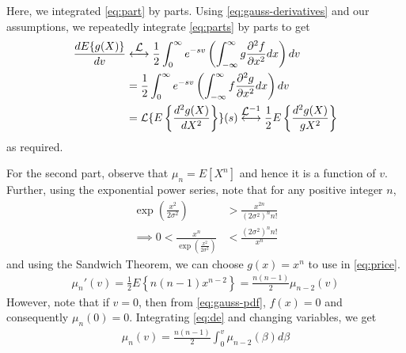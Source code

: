 \documentclass{beamer}
\newcommand\laplace{\ensuremath{\stackrel{\mathclap{\mbox{$\mathcal{L}$}}}{\longleftrightarrow}}}
\newcommand\laplaceinv{\ensuremath{\stackrel{\mathclap{\mbox{$\mathcal{L}^{-1}$}}}{\longleftrightarrow}}}
\begin{document}
\begin{frame}
	Here, we integrated \eqref{eq:part} by parts. Using \eqref{eq:gauss-derivatives} and our assumptions, we repeatedly integrate \eqref{eq:parts} by parts to get
	\begin{align}
		\frac{dE\{g(X)\}}{dv} &\laplace \frac{1}{2}\int_{0}^{\infty}e^{-sv}\left(\int_{-\infty}^{\infty}g\frac{\partial^2 f}{\partial x^2}dx\right)dv \label{eq:parts} \\
		&= \frac{1}{2}\int_{0}^{\infty}e^{-sv}\left(\int_{-\infty}^{\infty}f\frac{\partial^2 g}{\partial x^2}dx\right)dv \\
		&= \mathcal{L}\{E\left\{\frac{d^2g(X)}{dX^2}\right\}\}(s) \laplaceinv \frac{1}{2}E\left\{\frac{d^2g(X)}{gX^2}\right\}
		\label{eq:sol1-2}
	\end{align}
	as required.
\end{frame}

\begin{frame}
	For the second part, observe that $\mu_n = E[X^n]$ and hence it is a function of $v$. Further, using the exponential power series, note that for any positive integer $n$,
	\begin{align}
		\exp{\left(\frac{x^2}{2\sigma^2}\right)} &> \frac{x^{2n}}{(2\sigma^2)^nn!} \\
		\implies 0 < \frac{x^n}{\exp{\left(\frac{x^2}{2\sigma^2}\right)}} &< \frac{(2\sigma^2)^nn!}{x^n}
		\label{eq:sandwich}
	\end{align}
	and using the Sandwich Theorem, we can choose $g(x) = x^n$ to use in \eqref{eq:price}.
	\begin{align}
		\mu_n'(v) = \frac{1}{2}E\left\{n(n - 1)x^{n - 2}\right\} = \frac{n(n - 1)}{2}\mu_{n - 2}{(v)}
		\label{eq:de}
	\end{align}
	However, note that if $v = 0$, then from \eqref{eq:gauss-pdf}, $f(x) = 0$ and consequently $\mu_n(0) = 0$. Integrating \eqref{eq:de} and changing variables, we get
	\begin{align}
		\mu_n(v) = \frac{n(n - 1)}{2}\int_{0}^{v}\mu_{n - 2}(\beta)d\beta
		\label{eq:sol2}
	\end{align}
\end{frame}
\end{document}

